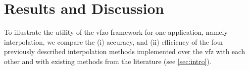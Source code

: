 \documentclass[preprint,12pt]{elsarticle}
\begin{document}
    
        
    

\section{Results and Discussion} \label{sec:results}

To illustrate the utility of the \gls{vfzo} framework for one application, namely interpolation, we compare the (i) accuracy, and (ii) efficiency of the four previously described interpolation methods implemented over the \gls{vfz} with each other and with existing methods from the literature (see \cref{sec:intro}).
\end{document}
